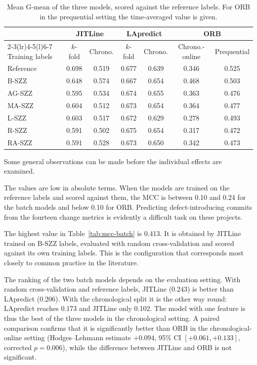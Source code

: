 \documentclass[12pt,a4paper,oneside]{report}
\begin{document}
\begin{table}[htbp]
\centering\small
\caption{Mean G-mean of the three models, scored against the reference
labels. For ORB in the prequential setting the time-averaged value is given.}
\label{tab:gmean}
\begin{tabular}{@{}lcccccc@{}}
\toprule
 & \multicolumn{2}{c}{JITLine} & \multicolumn{2}{c}{LApredict} & \multicolumn{2}{c}{ORB} \\
\cmidrule(lr){2-3}\cmidrule(lr){4-5}\cmidrule(l){6-7}
Training labels & $k$-fold & Chrono. & $k$-fold & Chrono. & Chrono.-online & Prequential \\
\midrule
Reference & 0.698 & 0.519 & 0.677 & 0.639 & 0.346 & 0.525 \\
B-SZZ & 0.648 & 0.574 & 0.667 & 0.654 & 0.468 & 0.503 \\
AG-SZZ & 0.595 & 0.534 & 0.674 & 0.655 & 0.363 & 0.476 \\
MA-SZZ & 0.604 & 0.512 & 0.673 & 0.654 & 0.364 & 0.477 \\
L-SZZ & 0.603 & 0.517 & 0.672 & 0.629 & 0.278 & 0.493 \\
R-SZZ & 0.591 & 0.502 & 0.675 & 0.654 & 0.317 & 0.472 \\
RA-SZZ & 0.591 & 0.528 & 0.673 & 0.650 & 0.342 & 0.473 \\
\bottomrule
\end{tabular}
\end{table}

Some general observations can be made before the individual effects are
examined.

The values are low in absolute terms. When the models are trained on the
reference labels and scored against them, the MCC is between 0.10 and 0.24
for the batch models and below 0.10 for ORB. Predicting defect-introducing
commits from the fourteen change metrics is evidently a difficult task on
these projects.

The highest value in Table~\ref{tab:mcc-batch} is 0.413. It is obtained by
JITLine trained on B-SZZ labels, evaluated with random cross-validation and
scored against its own training labels. This is the configuration that
corresponds most closely to common practice in the literature.

The ranking of the two batch models depends on the evaluation setting. With
random cross-validation and reference labels, JITLine (0.243) is better than
LApredict (0.206). With the chronological split it is the other way round:
LApredict reaches 0.173 and JITLine only 0.102. The model with one feature is
thus the best of the three models in the chronological setting. A paired
comparison confirms that it is significantly better than ORB in the
chronological-online setting (Hodges--Lehmann estimate $+0.094$, 95\% CI
$[+0.061, +0.133]$, corrected $p = 0.006$), while the difference between
JITLine and ORB is not significant.
\end{document}

